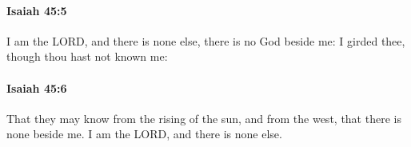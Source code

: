 		\paragraph{Isaiah 45:5} %
			\label{ISAIAH-45-5}

			I am the LORD, and there is none else, there is no God beside me: I girded thee, though thou hast not known me:


		\paragraph{Isaiah 45:6} %
			\label{ISAIAH-45-6}

			That they may know from the rising of the sun, and from the west, that there is none beside me. I am the LORD, and there is none else.


